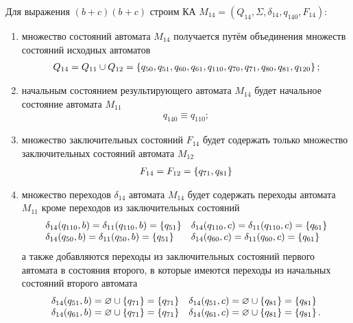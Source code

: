 \newpage
Для выражения \((b+c)(b+c)\) строим КА \(M_{14} = (Q_{14}, \Sigma, \delta_{14}, q_{140}, F_{14})\):
\begin{enumerate}
	\item множество состояний автомата \(M_{14}\) получается путём объединения множеств состояний исходных автоматов
	      \begin{align*}
		      Q_{14} = Q_{11} \cup Q_{12} = \left\{q_{50}, q_{51}, q_{60}, q_{61}, q_{110}, q_{70}, q_{71}, q_{80}, q_{81}, q_{120}\right\};
	      \end{align*}
	\item начальным состоянием результирующего автомата \(M_{14}\) будет начальное состояние автомата \(M_{11}\)
	      \begin{align*}
		      q_{140} \equiv q_{110};
	      \end{align*}
	\item множество заключительных состояний \(F_{14}\) будет содержать только множество заключительных состояний автомата \(M_{12}\)
	      \begin{align*}
		      F_{14} = F_{12} = \left\{q_{71}, q_{81}\right\}
	      \end{align*}
	\item множество переходов \(\delta_{14}\) автомата \(M_{14}\) будет содержать переходы автомата \(M_{11}\) кроме переходов из заключительных состояний
	      \begin{align*}
		      \begin{array}{ll}
			      \delta_{14}(q_{110}, b) = \delta_{11}(q_{110}, b) = \left\{q_{51}\right\} & \delta_{14}(q_{110}, c) = \delta_{11}(q_{110}, c) = \left\{q_{61}\right\} \\
			      \delta_{14}(q_{50}, b)  = \delta_{11}(q_{50}, b) = \left\{q_{51}\right\}  & \delta_{14}(q_{60}, c)  = \delta_{11}(q_{60}, c) = \left\{q_{61}\right\}
		      \end{array}
	      \end{align*}
	      а также добавляются переходы из заключительных состояний первого автомата в состояния второго, в которые имеются переходы из начальных состояний второго автомата
	      \begin{align*}
		      \begin{array}{ll}
			      \delta_{14}(q_{51}, b)  = \varnothing \cup \left\{q_{71}\right\} = \left\{q_{71}\right\} & \delta_{14}(q_{51}, c)  = \varnothing \cup \left\{q_{81}\right\} = \left\{q_{81}\right\}  \\
			      \delta_{14}(q_{61}, b)  = \varnothing \cup \left\{q_{71}\right\} = \left\{q_{71}\right\} & \delta_{14}(q_{61}, c)  = \varnothing \cup \left\{q_{81}\right\} = \left\{q_{81}\right\}.

\end{array}
\end{align*}
\end{enumerate}
